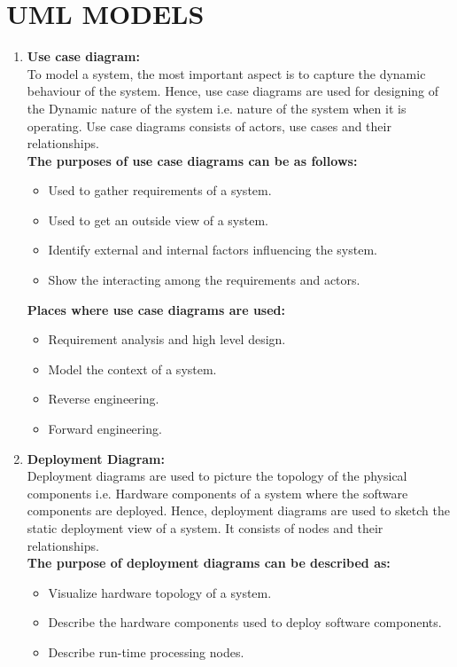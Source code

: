 \documentclass[12pt]{extreport}
\begin{document}
\section{UML MODELS}
\begin{enumerate}
\item \textbf{Use case diagram:}\\
To model a system, the most important aspect is to capture the dynamic behaviour of the system. Hence, use case diagrams are used for designing of the Dynamic nature of the system i.e. nature of the system when it is operating. Use case diagrams consists of actors, use cases and their relationships.\\
\newline
\textbf{The purposes of use case diagrams can be as follows:}
\begin{itemize}
	\item Used to gather requirements of a system.
	\item Used to get an outside view of a system.
	\item Identify external and internal factors influencing the system.
	\item Show the interacting among the requirements and actors.
\end{itemize}
\textbf{Places where use case diagrams are used:}
\begin{itemize}
	\item Requirement analysis and high level design.
	\item Model the context of a system.
	\item Reverse engineering.
	\item Forward engineering.
\end{itemize}

\item \textbf{Deployment Diagram:}\\
Deployment diagrams are used to picture the topology of the physical components i.e. Hardware components of a system where the software components are deployed. Hence, deployment diagrams are used to sketch the static deployment view of a system. It consists of nodes and their relationships.\\
\newline
\textbf{The purpose of deployment diagrams can be described as:}
\begin{itemize}
	\item Visualize hardware topology of a system.
	\item Describe the hardware components used to deploy software components.
	\item Describe run-time processing nodes.
\end{itemize}


\end{enumerate}
\end{document}
